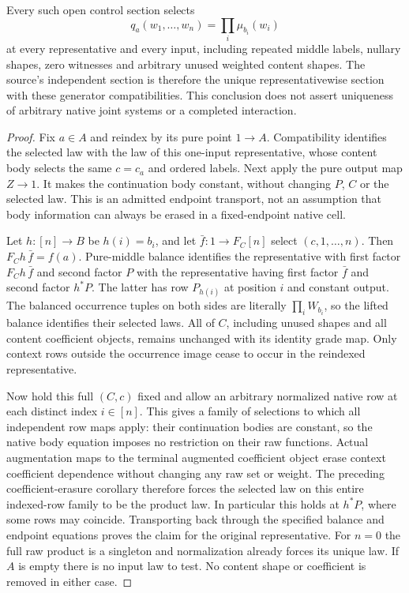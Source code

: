 \documentclass{article}
\begin{document}
\begin{corollary}
Every such open control section selects
\[
 q_a(w_1,\ldots,w_n)=\prod_i\mu_{b_i}(w_i)
\]
at every representative and every input, including repeated middle labels,
nullary shapes, zero witnesses and arbitrary unused weighted content shapes.
The source's independent section is therefore the unique representativewise
section with these generator compatibilities. This conclusion does not assert
uniqueness of arbitrary native joint systems or a completed interaction.
\end{corollary}
\begin{proof}
Fix $a\in A$ and reindex by its pure point $1\to A$. Compatibility identifies
the selected law with the law of this one-input representative, whose content
body selects the same $c=c_a$ and ordered labels. Next apply the pure output
map $Z\to1$. It makes the continuation body constant, without changing $P$,
$C$ or the selected law. This is an admitted endpoint transport, not an
assumption that body information can always be erased in a fixed-endpoint
native cell.

Let $h:[n]\to B$ be $h(i)=b_i$, and let
$\bar f:1\to F_C[n]$ select $(c,1,\ldots,n)$.
Then $F_Ch\,\bar f=f(a)$. Pure-middle balance identifies the representative
with first factor $F_Ch\,\bar f$ and second factor $P$ with the representative
having first factor $\bar f$ and second factor $h^*P$.
The latter has row $P_{h(i)}$ at position $i$ and constant output.
The balanced occurrence tuples on both sides are literally
$\prod_iW_{b_i}$, so the lifted balance identifies their selected laws.
All of $C$, including unused shapes and all content coefficient objects,
remains unchanged with its identity grade map. Only context rows outside the
occurrence image cease to occur in the reindexed representative.

Now hold this full $(C,c)$ fixed and allow an arbitrary normalized native row
at each distinct index $i\in[n]$. This gives a family of selections to which
all independent row maps apply: their continuation bodies are constant, so
the native body equation imposes no restriction on their raw functions.
Actual augmentation maps to the terminal augmented coefficient object erase
context coefficient dependence without changing any raw set or weight.
The preceding coefficient-erasure corollary therefore forces the selected
law on this entire indexed-row family to be the product law. In particular
this holds at $h^*P$, where some rows may coincide. Transporting back through
the specified balance and endpoint equations proves the claim for the
original representative. For $n=0$ the full raw product is a singleton and
normalization already forces its unique law. If $A$ is empty there is no
input law to test. No content shape or coefficient is removed in either case.
\end{proof}
\end{document}
